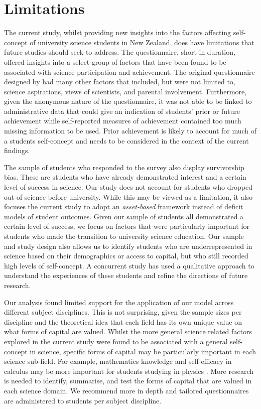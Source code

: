 \section*{Limitations}
The current study, whilst providing new insights into the factors affecting self-concept of university science students in New Zealand, does have limitations that future studies should seek to address. The questionnaire, short in duration, offered insights into a select group of factors that have been found to be associated with science participation and achievement. The original questionnaire designed by \cite{dewitt2011high} had many other factors that included, but were not limited to, science aspirations, views of scientists, and parental involvement. Furthermore, given the anonymous nature of the questionnaire, it was not able to be linked to administrative data that could give an indication of students' prior or future achievement while self-reported measures of achievement contained too much missing information to be used. Prior achievement is likely to account for much of a students self-concept and needs to be considered in the context of the current findings.

The sample of students who responded to the survey also display survivorship bias. These are students who have already demonstrated interest and a certain level of success in science. Our study does not account for students who dropped out of science before university. While this may be viewed as a limitation, it also focuses the current study to adopt an \textit{asset-based} framework instead of deficit models of student outcomes. Given our sample of students all demonstrated a certain level of success, we focus on factors that were particularly important for students who made the transition to university science education. Our sample and study design also allows us to identify students who are underrepresented in science based on their demographics or access to capital, but who still recorded high levels of self-concept. A concurrent study has used a qualitative approach to understand the experiences of these students and refine the directions of future research.

Our analysis found limited support for the application of our model across different subject disciplines. This is not surprising, given the sample sizes per discipline and the theoretical idea that each field has its own unique value on what forms of capital are valued. Whilst the more general science related factors explored in the current study were found to be associated with a general self-concept in science, specific forms of capital may be particularly important in each science sub-field. For example, mathematics knowledge and self-efficacy in calculus may be more important for students studying in physics \cite{Black2016,Ellis_2016}. More research is needed to identify, summarise, and test the forms of capital that are valued in each science domain. We recommend more in depth and tailored questionnaires are administered to students per subject discipline.  

